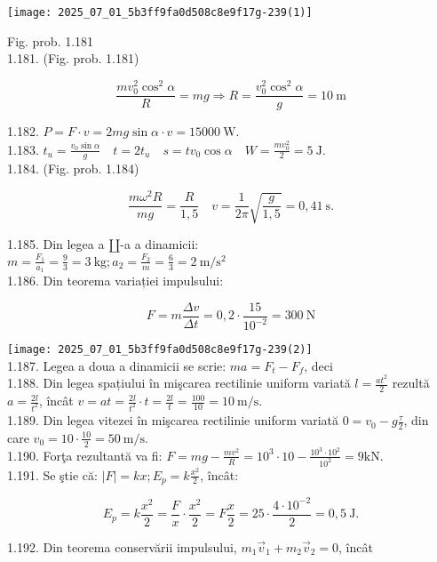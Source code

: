 \texttt{[image: 2025\_07\_01\_5b3ff9fa0d508c8e9f17g-239(1)]}

Fig. prob. 1.181\\

1.181. (Fig. prob. 1.181)

$$
\frac{m v_{0}^{2} \cos ^{2} \alpha}{R}=m g \Rightarrow R=\frac{v_{0}^{2} \cos ^{2} \alpha}{g}=10 \mathrm{~m}
$$

1.182. $P=F \cdot v=2 m g \sin \alpha \cdot v=15000 \mathrm{~W}$.\\
1.183. $t_{u}=\frac{v_{0} \sin \alpha}{g} \quad t=2 t_{u} \quad s=t v_{0} \cos \alpha \quad W=\frac{m v_{0}^{2}}{2}=5 \mathrm{~J}$.\\
1.184. (Fig. prob. 1.184)

$$
\frac{m \omega^{2} R}{m g}=\frac{R}{1,5} \quad v=\frac{1}{2 \pi} \sqrt{\frac{g}{1,5}}=0,41 \mathrm{~s} .
$$

1.185. Din legea a $\amalg$-a a dinamicii:\\
$m=\frac{F_{1}}{a_{1}}=\frac{9}{3}=3 \mathrm{~kg} ; a_{2}=\frac{F_{2}}{m}=\frac{6}{3}=2 \mathrm{~m} / \mathrm{s}^{2}$\\
1.186. Din teorema variației impulsului:

$$
F=m \frac{\Delta v}{\Delta t}=0,2 \cdot \frac{15}{10^{-2}}=300 \mathrm{~N}
$$

\texttt{[image: 2025\_07\_01\_5b3ff9fa0d508c8e9f17g-239(2)]}\\
1.187. Legea a doua a dinamicii se scrie: $m a=F_{t}-F_{f}$, deci\\
1.188. Din legea spațiului în mişcarea rectilinie uniform variată $l=\frac{a t^{2}}{2}$ rezultă $a=\frac{2 l}{t^{2}}$, încât $v=a t=\frac{2 l}{t^{2}} \cdot t=\frac{2 l}{t}=\frac{100}{10}=10 \mathrm{~m} / \mathrm{s}$.\\
1.189. Din legea vitezei în mişcarea rectilinie uniform variată $0=v_{0}-g \frac{\tau}{2}$, din care $v_{0}=10 \cdot \frac{10}{2}=50 \mathrm{~m} / \mathrm{s}$.\\
1.190. Forţa rezultantă va fi: $F=m g-\frac{m v^{2}}{R}=10^{3} \cdot 10-\frac{10^{3} \cdot 10^{2}}{10^{2}}=9 \mathrm{kN}$.\\
1.191. Se ştie că: $|F|=k x ; E_{p}=k \frac{x^{2}}{2}$, încât:

$$
E_{p}=k \frac{x^{2}}{2}=\frac{F}{x} \cdot \frac{x^{2}}{2}=F \frac{x}{2}=25 \cdot \frac{4 \cdot 10^{-2}}{2}=0,5 \mathrm{~J} .
$$

1.192. Din teorema conservării impulsului, $m_{1} \vec{v}_{1}+m_{2} \vec{v}_{2}=0$, încât

